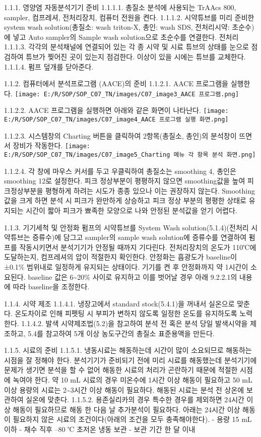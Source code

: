 \documentclass[
]{book}
\begin{document}
1.1.1. 영양염 자동분석기기 준비
1.1.1.1. 총질소 분석에 사용되는 TrAAcs 800, sampler, 컴프레셔, 전처리장치, 컴퓨터 전원을 켠다.
1.1.1.2. 시약튜브를 미리 준비한 system wash solution(총질소: wash triton-X, 총인: wash SDS, 전처리시약: 초순수)에 넣고 Auto sampler의 Sample wash solution으로 초순수를 연결한다. 전처리
1.1.1.3. 각각의 분석채널에 연결되어 있는 각 종 시약 및 시료 튜브의 상태를 눈으로 점검하여 튜브가 찢어진 곳이 있는지 점검한다. 이상이 있을 시에는 튜브를 교체한다.
1.1.1.4. 펌프 덮개를 닫아준다.

1.1.2. 컴퓨터에서 분석프로그램 (AACE)의 준비
1.1.2.1. AACE 프로그램을 실행한다.
\texttt{[image: E:/R/SOP/SOP\_C07\_TN/images/C07\_image3\_AACE 프로그램.png]}

1.1.2.2. AACE 프로그램을 실행하면 아래와 같은 화면이 나타난다.
\texttt{[image: E:/R/SOP/SOP\_C07\_TN/images/C07\_image4\_AACE 프로그램 실행 화면.png]}

1.1.2.3. 시스템창의 Charting 버튼을 클릭하여 2항목(총질소, 총인)의 분석창이 뜨면서 장비가 작동한다.
\texttt{[image: E:/R/SOP/SOP\_C07\_TN/images/C07\_image5\_Charting 메뉴 각 항목 분석 화면.png]}

1.1.2.4. 각 창에 마우스 커서를 두고 우클릭하여 총질소는 smoothing 4, 총인은 smoothing 12로 설정한다. 피크 정상부분이 평평하지 않으면 smoothing값을 높여 피크정상부분을 평형하게 하려는 시도가 종종 있으나 이는 권장하지 않는다. Smoothing 값을 크게 하면 분석 시 피크가 완만하게 상승하고 피크 정상 부분의 평평한 상태로 유지되는 시간이 짧아 피크가 뾰족한 모양으로 나와 안정된 분석값을 얻기 어렵다.

1.1.3. 기기세척 및 안정화
펌프의 시약튜브를 System Wash solution(5.1.4)(전처리 시약튜브는 증류수)에 담그고 sampler의 sample wash solution에 증류수를 연결하여 펌프를 작동시키면서 분석기기가 안정될 때까지 기다린다. 전처리장치의 온도가 110℃에 도달하는지, 컴프레셔의 압이 적절한지 확인한다. 안정화는 흡광도가 baseline이 ±0.1\% 범위내로 일정하게 유지되는 상태이다. 기기를 켠 후 안정화까지 약 1시간이 소요된다. baseline 값은 6\textasciitilde20\% 사이로 유지하고 이를 벗어날 경우 아래 9.2.2.1의 내용에 따라 baseline을 조정한다.

1.1.4. 시약 제조
1.1.4.1. 냉장고에서 standard stock(5.4.1)을 꺼내서 실온으로 맞춘다. 온도차이로 인해 피펫팅 시 부피가 변하지 않도록 일정한 온도를 유지하도록 노력한다.
1.1.4.2. 발색 시약제조법(5.2)을 참고하여 분석 전 혹은 분석 당일 발색시약을 제조하고, 5.4를 참고하여 5개 이상 농도구간의 총질소 표준용액을 만든다.

1.1.5. 시료의 준비
1.1.5.1. 냉동시료는 해동하는데 시간이 많이 소요되므로 해동하는 시점을 잘 정해야 한다. 분석기기가 준비되기 전에 미리 시료를 해동했는데 분석기기에 문제가 생기면 분석을 할 수 없어 해동한 시료의 처리가 곤란하기 때문에 적절한 시점에 녹여야 한다. 약 10 mL 시료의 경우 미온수에 1시간 이상 해동이 필요하고 50 mL 이상 용량의 시료는 2\textasciitilde3시간 이상 해동이 필요하다. 해동된 시료는 분석 전 상온에 보관하여 실온에 맞춘다.
1.1.5.2. 용존실리카의 경우 특수한 경우를 제외하면 24시간 이상 해동이 필요하므로 해동 한 다음 날 추가분석이 필요하다. 아래는 24시간 이상 해동이 필요하지 않은 시료의 조건이다(아래의 조건을 모두 충족해야한다).
- 용량 15 mL 이하
- 채수 직후 --80 ℃ 초저온 냉동 보관
- 보관 기간 한 달 이내
\end{document}

